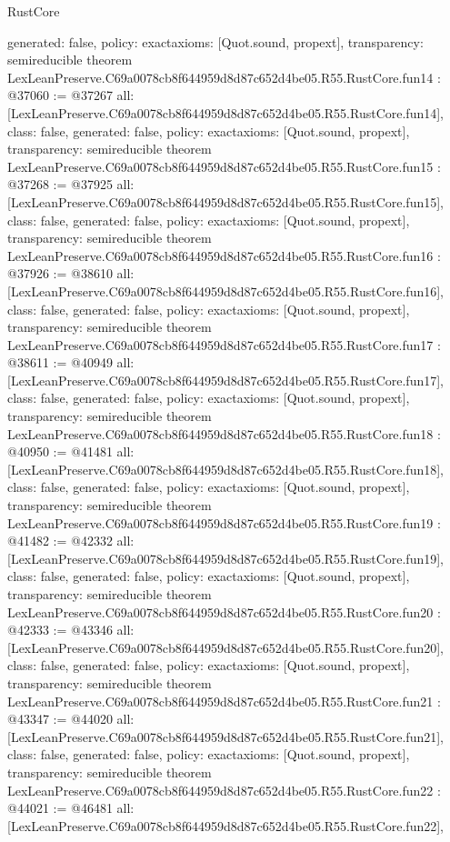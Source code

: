 \begin{lexlean}{RustCore}
\begin{coremodule}
{  generated: false,
  policy: exact{axioms: [Quot.sound, propext]},
  transparency: semireducible
}
theorem LexLeanPreserve.C69a0078cb8f644959d8d87c652d4be05.R55.RustCore.fun14 : @37060 := @37267 {
  all: [LexLeanPreserve.C69a0078cb8f644959d8d87c652d4be05.R55.RustCore.fun14],
  class: false,
  generated: false,
  policy: exact{axioms: [Quot.sound, propext]},
  transparency: semireducible
}
theorem LexLeanPreserve.C69a0078cb8f644959d8d87c652d4be05.R55.RustCore.fun15 : @37268 := @37925 {
  all: [LexLeanPreserve.C69a0078cb8f644959d8d87c652d4be05.R55.RustCore.fun15],
  class: false,
  generated: false,
  policy: exact{axioms: [Quot.sound, propext]},
  transparency: semireducible
}
theorem LexLeanPreserve.C69a0078cb8f644959d8d87c652d4be05.R55.RustCore.fun16 : @37926 := @38610 {
  all: [LexLeanPreserve.C69a0078cb8f644959d8d87c652d4be05.R55.RustCore.fun16],
  class: false,
  generated: false,
  policy: exact{axioms: [Quot.sound, propext]},
  transparency: semireducible
}
theorem LexLeanPreserve.C69a0078cb8f644959d8d87c652d4be05.R55.RustCore.fun17 : @38611 := @40949 {
  all: [LexLeanPreserve.C69a0078cb8f644959d8d87c652d4be05.R55.RustCore.fun17],
  class: false,
  generated: false,
  policy: exact{axioms: [Quot.sound, propext]},
  transparency: semireducible
}
theorem LexLeanPreserve.C69a0078cb8f644959d8d87c652d4be05.R55.RustCore.fun18 : @40950 := @41481 {
  all: [LexLeanPreserve.C69a0078cb8f644959d8d87c652d4be05.R55.RustCore.fun18],
  class: false,
  generated: false,
  policy: exact{axioms: [Quot.sound, propext]},
  transparency: semireducible
}
theorem LexLeanPreserve.C69a0078cb8f644959d8d87c652d4be05.R55.RustCore.fun19 : @41482 := @42332 {
  all: [LexLeanPreserve.C69a0078cb8f644959d8d87c652d4be05.R55.RustCore.fun19],
  class: false,
  generated: false,
  policy: exact{axioms: [Quot.sound, propext]},
  transparency: semireducible
}
theorem LexLeanPreserve.C69a0078cb8f644959d8d87c652d4be05.R55.RustCore.fun20 : @42333 := @43346 {
  all: [LexLeanPreserve.C69a0078cb8f644959d8d87c652d4be05.R55.RustCore.fun20],
  class: false,
  generated: false,
  policy: exact{axioms: [Quot.sound, propext]},
  transparency: semireducible
}
theorem LexLeanPreserve.C69a0078cb8f644959d8d87c652d4be05.R55.RustCore.fun21 : @43347 := @44020 {
  all: [LexLeanPreserve.C69a0078cb8f644959d8d87c652d4be05.R55.RustCore.fun21],
  class: false,
  generated: false,
  policy: exact{axioms: [Quot.sound, propext]},
  transparency: semireducible
}
theorem LexLeanPreserve.C69a0078cb8f644959d8d87c652d4be05.R55.RustCore.fun22 : @44021 := @46481 {
  all: [LexLeanPreserve.C69a0078cb8f644959d8d87c652d4be05.R55.RustCore.fun22],
}
\end{coremodule}
\end{lexlean}
